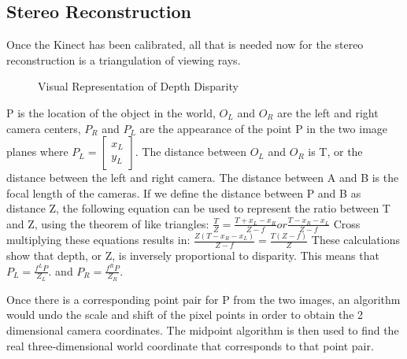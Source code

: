 \documentclass[pdftex,10.5pt]{report}
\begin{document}
\subsection{Stereo Reconstruction}
Once the Kinect has been calibrated, all that is needed now for the stereo reconstruction is a triangulation of viewing rays.

\begin{figure}[H]
\centering
\caption{Visual Representation of Depth Disparity}
\end{figure}

P is the location of the object in the world, $O_{L}$ and $O_{R}$ are the left and right camera centers, $P_{R}$ and $P_{L}$ are the appearance of the point P in the two image planes where $P_{L}= 
\begin{bmatrix}
x_{L} \\
y_{L} 
\end{bmatrix} $. 
The distance between $O_{L}$ and $O_{R}$ is T, or the distance between the left and right camera. The distance between A and B is the focal length of the cameras. If we define the distance between P and B as distance Z, the following equation  can be used to represent the ratio between T and Z, using the theorem of like triangles: 
$\frac{T}{Z}=\frac{T+x_{L}-x_{R}}{Z-f} or \frac{T-{x_{R}-x_{L}}}{Z-f} $ 
Cross multiplying these equations results in: 
$\frac{Z(T-x_{R}-x_{L})}{Z-f} = \frac{T(Z-f)}{Z} $ 
These calculations show that depth, or Z, is inversely proportional to disparity. This means that  $P_{L}= \frac{f^{L}P}{Z_{L}}. $ and $P_{R}= \frac{f^{R}P}{Z_{R}}. $ 

Once there is a corresponding point pair for P from the two images, an algorithm would undo the scale and shift of the pixel points in order to obtain the 2 dimensional camera coordinates. The midpoint algorithm is then used to find the real three-dimensional world coordinate that corresponds to that point pair.
\end{document}
